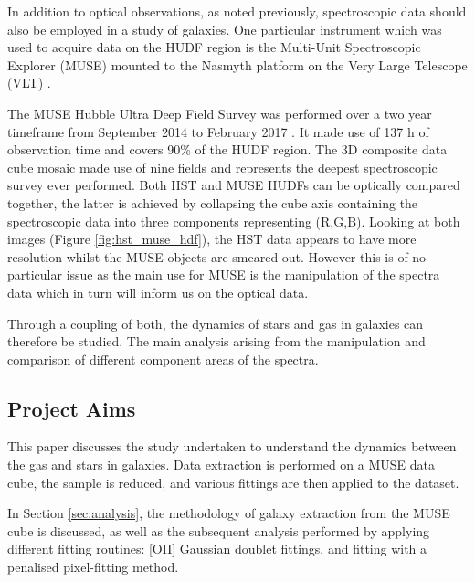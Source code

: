 \documentclass[12pt, twocolumn]{revtex4-1}    %
\begin{document}
In addition to optical observations, as noted previously, spectroscopic data should also be employed in a study of galaxies. One particular instrument which was used to acquire data on the HUDF region is the Multi-Unit Spectroscopic Explorer (MUSE) mounted to the Nasmyth platform on the Very Large Telescope (VLT) \citep{bacon_muse_proposal}. 


The MUSE Hubble Ultra Deep Field Survey was performed over a two year timeframe from September 2014 to February 2017 \citep{bacon_muse_hudf}. It made use of 137 h of observation time and covers 90\% of the HUDF region. The 3D composite data cube mosaic made use of nine fields and represents the deepest spectroscopic survey ever performed. Both HST and MUSE HUDFs can be optically compared together, the latter is achieved by collapsing the cube axis containing the spectroscopic data into three components representing (R,G,B). Looking at both images (Figure \ref{fig:hst_muse_hdf}), the HST data appears to have more resolution whilst the MUSE objects are smeared out. However this is of no particular issue as the main use for MUSE is the manipulation of the spectra data which in turn will inform us on the optical data.




Through a coupling of both, the dynamics of stars and gas in galaxies can therefore be studied. The main analysis arising from the manipulation and comparison of different component areas of the spectra.

\subsection{Project Aims}
This paper discusses the study undertaken to understand the dynamics between the gas and stars in galaxies. Data extraction is performed on a MUSE data cube, the sample is reduced, and various fittings are then applied to the dataset.

In Section \ref{sec:analysis}, the methodology of galaxy extraction from the MUSE cube is discussed, as well as the subsequent analysis performed by applying different fitting routines: [OII] Gaussian doublet fittings, and fitting with a penalised pixel-fitting method. 
\end{document}
